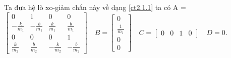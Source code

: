 \begin{example}
Ta đưa hệ lò xo-giảm chấn này về dạng \eqref{ct2.1.1}
\bigskip
ta có
\newline
A = $\begin{bmatrix}
     0 & 1 & 0 & 0\\
     -\frac{k}{m_1} & -\frac{b}{m_1} & \frac{k}{m_1} & \frac{b}{m_1}\\
     0 & 0 & 0 & 1\\
     \frac{k}{m_2} & \frac{b}{m_2} & -\frac{k}{m_2} & -\frac{b}{m_2}
     \end{bmatrix}
\quad B = \begin{bmatrix}
     0 \\ \frac{1}{m_1} \\ 0 \\ 0
     \end{bmatrix}
\quad C = \begin{bmatrix}
     0 & 0 & 1 & 0 
     \end{bmatrix}
\quad D = 0.$
\end{example}

